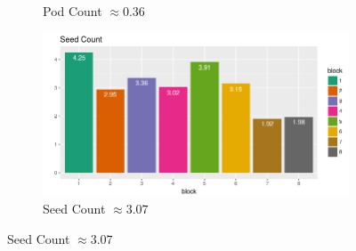 \documentclass[table]{beamer}
\begin{document}
\begin{frame}
\begin{figure}
\begin{subfigure}[b]{0.44\textwidth}
            \caption[]%
            {{\small Pod Count $\approx 0.36$}}    
        \end{subfigure}
        \quad
        \begin{subfigure}[b]{0.44\textwidth}   
            \centering 
            \includegraphics[width=\textwidth]{SeedCount.png}
            \caption[]%
            {{\small Seed Count $\approx 3.07$}}    
        \end{subfigure}
    \end{figure}
\end{frame}
\end{document}
